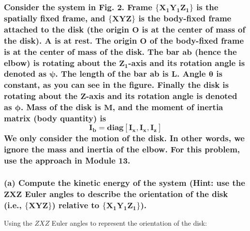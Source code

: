 \documentclass[12pt, letterpaper]{../assignment}
\begin{document}
\subsubsection*{Consider the system in Fig. 2. Frame $\bm{\{X_1 Y_1 Z_1\}}$ is the spatially fixed frame,
and $\bm{\{XYZ\}}$ is the body-fixed frame attached to the disk (the origin $\bm{O}$ is at the center of mass of the disk).
A is at rest.
The origin $\bm{O}$ of the body-fixed frame is at the center of mass of the disk.
The bar $\bm{ab}$ (hence the elbow) is rotating about the $\bm{Z_1}$-axis and its rotation angle is denoted as $\bm{\psi}$.
The length of the bar ab is $\bm{L}$.
Angle $\bm{\theta}$ is constant, as you can see in the figure.
Finally the disk is rotating about the $\bm{Z}$-axis and its rotation angle is denoted as $\bm{\phi}$.
Mass of the disk is $\bm{M}$, and the moment of inertia matrix (body quantity) is
$$\bm{ I_b = \textbf{diag}[I_x, I_x, I_z ]}$$
We only consider the motion of the disk.
In other words, we ignore the mass and inertia of the elbow.
For this problem, use the approach in Module 13.}

\subsubsection*{(a) Compute the kinetic energy of the system
(Hint: use the $\bm{ZXZ}$ Euler angles to describe the orientation of the disk (i.e., $\bm{\{XYZ\}}$) relative to $\bm{\{X_1 Y_1 Z_1\}}$).}

Using the $ZXZ$ Euler angles to represent the orientation of the disk:
\end{document}
